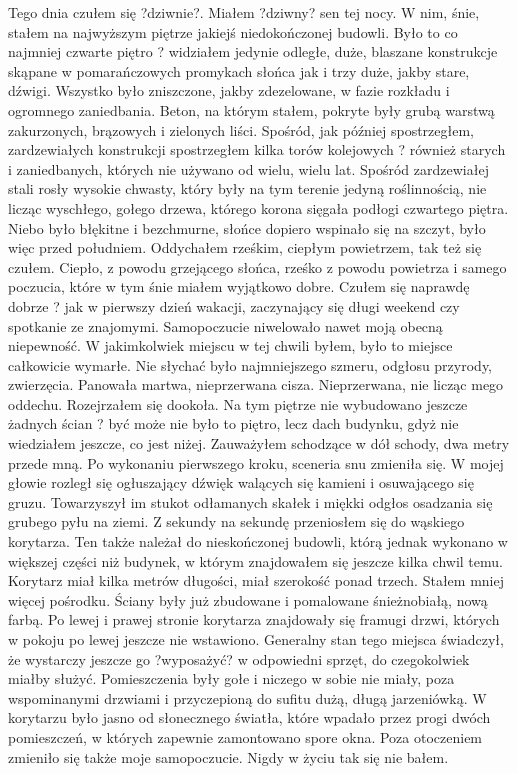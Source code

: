 \documentclass[../MAIN.tex]{subfiles}
\begin{document}
Tego dnia czułem się ?dziwnie?.
Miałem ?dziwny? sen tej nocy. W nim, śnie, stałem na najwyższym piętrze jakiejś niedokończonej budowli. Było to co najmniej czwarte piętro ? widziałem jedynie odległe, duże, blaszane konstrukcje skąpane w pomarańczowych promykach słońca jak i trzy duże, jakby stare, dźwigi.
Wszystko było zniszczone, jakby zdezelowane, w fazie rozkładu i ogromnego zaniedbania. Beton, na którym stałem, pokryte były grubą warstwą zakurzonych, brązowych i zielonych liści. Spośród, jak później spostrzegłem, zardzewiałych konstrukcji spostrzegłem kilka torów kolejowych ? również starych i zaniedbanych, których nie używano od wielu, wielu lat.
Spośród zardzewiałej stali rosły wysokie chwasty, który były na tym terenie jedyną roślinnością, nie licząc wyschłego, gołego drzewa, którego korona sięgała podłogi czwartego piętra.
Niebo było błękitne i bezchmurne, słońce dopiero wspinało się na szczyt, było więc przed południem. Oddychałem rześkim, ciepłym powietrzem, tak też się czułem. Ciepło, z powodu grzejącego słońca, rześko z powodu powietrza i samego poczucia, które w tym śnie miałem wyjątkowo dobre. Czułem się naprawdę dobrze ? jak w pierwszy dzień wakacji, zaczynający się długi weekend czy spotkanie ze znajomymi. Samopoczucie niwelowało nawet moją obecną niepewność.
W jakimkolwiek miejscu w tej chwili byłem, było to miejsce całkowicie wymarłe. Nie słychać było najmniejszego szmeru, odgłosu przyrody, zwierzęcia. Panowała martwa, nieprzerwana cisza. Nieprzerwana, nie licząc mego oddechu.
Rozejrzałem się dookoła.
Na tym piętrze nie wybudowano jeszcze żadnych ścian ? być może nie było to piętro, lecz dach budynku, gdyż nie wiedziałem jeszcze, co jest niżej. Zauważyłem schodzące w dół schody, dwa metry przede mną. Po wykonaniu pierwszego kroku, sceneria snu zmieniła się.
W mojej głowie rozległ się ogłuszający dźwięk walących się kamieni i osuwającego się gruzu. Towarzyszył im stukot odłamanych skałek i miękki odgłos osadzania się grubego pyłu na ziemi. Z sekundy na sekundę przeniosłem się do wąskiego korytarza.
Ten także należał do nieskończonej budowli, którą jednak wykonano w większej części niż budynek, w którym znajdowałem się jeszcze kilka chwil temu.
Korytarz miał kilka metrów długości, miał szerokość ponad trzech. Stałem mniej więcej pośrodku.
Ściany były już zbudowane i pomalowane śnieżnobiałą, nową farbą. Po lewej i prawej stronie korytarza znajdowały się framugi drzwi, których w pokoju po lewej jeszcze nie wstawiono. Generalny stan tego miejsca świadczył, że wystarczy jeszcze go ?wyposażyć? w odpowiedni sprzęt, do czegokolwiek miałby służyć. Pomieszczenia były gołe i niczego w sobie nie miały, poza wspominanymi drzwiami i przyczepioną do sufitu dużą, długą jarzeniówką.
W korytarzu było jasno od słonecznego światła, które wpadało przez progi dwóch pomieszczeń, w których zapewnie zamontowano spore okna.
Poza otoczeniem zmieniło się także moje samopoczucie.
Nigdy w życiu tak się nie bałem.
\end{document}
